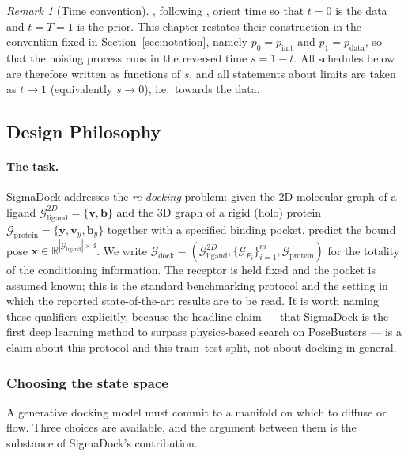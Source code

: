 \documentclass[a4paper,12pt]{article}
\theoremstyle{remark}
\newtheorem{remark}[theorem]{Remark}
\begin{document}
\begin{remark}[Time convention]
\label{rem:time-convention}
\cite{bortoliRiemannianScoreBasedGenerative2022}, following \cite{bortoliRiemannianScoreBasedGenerative2022}, orient time so that $t=0$ is the data
and $t=T=1$ is the prior. This chapter restates their construction in the convention fixed in
Section~\ref{sec:notation}, namely $p_0 = p_{\mathrm{init}}$ and $p_1 = p_{\mathrm{data}}$, so
that the noising process runs in the reversed time $s = 1-t$. All schedules below are therefore
written as functions of $s$, and all statements about limits are taken as $t \to 1$ (equivalently
$s \to 0$), i.e.\ towards the data.
\end{remark}

\subsection{Design Philosophy}
\label{sec:DesignPhilosophy}

\paragraph{The task.} SigmaDock addresses the \emph{re-docking} problem: given the 2D molecular
graph of a ligand $\mathcal{G}^{2D}_{\text{ligand}} = \{\mathbf{v}, \mathbf{b}\}$ and the 3D graph
of a rigid (holo) protein $\mathcal{G}_{\text{protein}} = \{\mathbf{y}, \mathbf{v}_y, \mathbf{b}_y\}$
together with a specified binding pocket, predict the bound pose
$\mathbf{x} \in \mathbb{R}^{|\mathcal{G}_{\text{ligand}}| \times 3}$. We write
$\mathcal{G}_{\text{dock}} = (\mathcal{G}^{2D}_{\text{ligand}}, \{\mathcal{G}_{F_i}\}_{i=1}^{m},
\mathcal{G}_{\text{protein}})$ for the totality of the conditioning information. The receptor is
held fixed and the pocket is assumed known; this is the standard benchmarking protocol and the
setting in which the reported state-of-the-art results are to be read. It is worth naming these
qualifiers explicitly, because the headline claim --- that SigmaDock is the first deep learning
method to surpass physics-based search on PoseBusters --- is a claim about this protocol and this
train--test split, not about docking in general.

\subsubsection{Choosing the state space}

A generative docking model must commit to a manifold on which to diffuse or flow. Three choices
are available, and the argument between them is the substance of SigmaDock's contribution.
\end{document}
